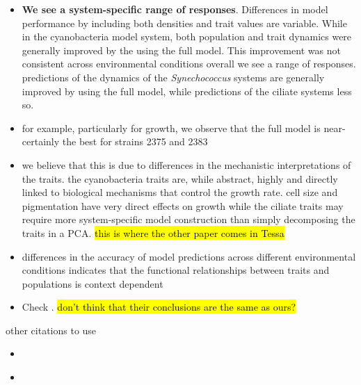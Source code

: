 \documentclass{getwriting}
\begin{document}
\begin{itemize}
    \item \textbf{We see a system-specific range of responses}. Differences in model performance by including both densities and trait values are variable. While in the cyanobacteria model system, both population and trait dynamics were generally improved by the using the full model. This improvement was not consistent across environmental conditions overall we see a range of responses. predictions of the dynamics of the \textit{Synechococcus} systems are generally improved by using the full model, while predictions of the ciliate systems less so.
    \item for example, particularly for growth, we observe that the full model is near-certainly the best for strains 2375 and 2383
    \item we believe that this is due to differences in the mechanistic interpretations of the traits. the cyanobacteria traits are, while abstract, highly and directly linked to biological mechanisms that control the growth rate. cell size and pigmentation have very direct effects on growth while the ciliate traits may require more system-specific model construction than simply decomposing the traits in a PCA. \hl{this is where the other paper comes in Tessa}
    \item differences in the accuracy of model predictions across different environmental conditions indicates that the functional relationships between traits and populations is context dependent
    \item Check \cite{Bernhardt2018}. \hl{don't think that their conclusions are the same as ours?} 
\end{itemize} 

other citations to use

\begin{itemize}
    \item \cite{Violle2007}
    \item \cite{Wieczynski2021}
\end{itemize}



\pagebreak

\end{document}
